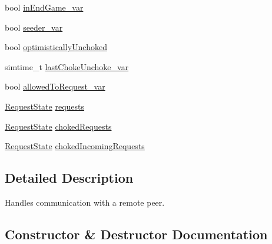 \begin{DoxyCompactItemize}
\item 
bool \hyperlink{classBTPeerWireClientHandlerBase_a4dfd1a6d41107dec5a2f705bc9040ca3}{in\+End\+Game\+\_\+var}
\item 
bool \hyperlink{classBTPeerWireClientHandlerBase_a6bdae2eb034d492ec5ecded7c196ae59}{seeder\+\_\+var}
\item 
bool \hyperlink{classBTPeerWireClientHandlerBase_a51549ed5b841a0cc04ab9d6c31720592}{optimistically\+Unchoked}
\item 
simtime\+\_\+t \hyperlink{classBTPeerWireClientHandlerBase_ac2d85a86b9690c3f5b6ece4437db1747}{last\+Choke\+Unchoke\+\_\+var}
\item 
bool \hyperlink{classBTPeerWireClientHandlerBase_aa454fe745c1328319b01ccf875bef36a}{allowed\+To\+Request\+\_\+var}
\item 
\hyperlink{classRequestState}{Request\+State} \hyperlink{classBTPeerWireClientHandlerBase_a642a6355fb6d1940b96339e583b00578}{requests}
\item 
\hyperlink{classRequestState}{Request\+State} \hyperlink{classBTPeerWireClientHandlerBase_ac277e0f148cbe859d9895d061e397ef4}{choked\+Requests}
\item 
\hyperlink{classRequestState}{Request\+State} \hyperlink{classBTPeerWireClientHandlerBase_a18d077fec81fc4863b065045e953ab8c}{choked\+Incoming\+Requests}
\end{DoxyCompactItemize}


\subsection{Detailed Description}
Handles communication with a remote peer. 

\subsection{Constructor \& Destructor Documentation}
\hypertarget{classBTPeerWireClientHandlerBase_ac7325e2bd56ed10022900f02163b0c1f}{}
